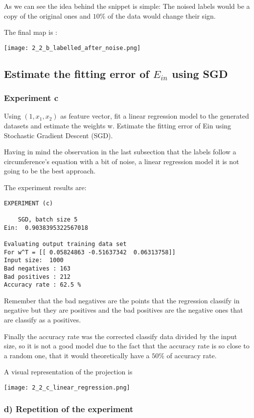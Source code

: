   As we can see the idea behind the snippet is simple: The noised labels would be a copy of the original ones and $10\%$ of the data would change their sign.

  The final map is :


  \texttt{[image: 2\_2\_b\_labelled\_after\_noise.png]}
  

  \subsection{ Estimate the fitting error of $E_{in}$ using SGD}

  \subsubsection{Experiment c}
  Using $(1, x_1, x_2)$ as feature vector, fit a linear regression model to the generated datasets and estimate the weights w. Estimate the fitting error of Ein using Stochastic Gradient Descent (SGD).

  Having in mind the observation in the last subsection that the labels follow a circumference's equation with a bit of noise, a linear regression model it is not going to be the best approach.

  The experiment results are:
\begin{verbatim}
EXPERIMENT (c) 

	SGD, batch size 5
Ein:  0.9038395322567018

Evaluating output training data set
For w^T = [[ 0.05824863 -0.51637342  0.06313758]]
Input size:  1000
Bad negatives : 163
Bad positives : 212
Accuracy rate : 62.5 %
\end{verbatim}


Remember that the bad negatives are the points that the regression classify in negative but they are positives and the bad positives are the negative ones that are classify as a positives.

Finally the accuracy rate was the corrected classify data divided by the input size, so it is not a good model due to the fact that the accuracy rate is so close to a random one, that it would theoretically have a $50\%$ of accuracy rate.

A visual representation of the projection is


\texttt{[image: 2\_2\_c\_linear\_regression.png]}

\subsubsection{d) Repetition of the experiment}

